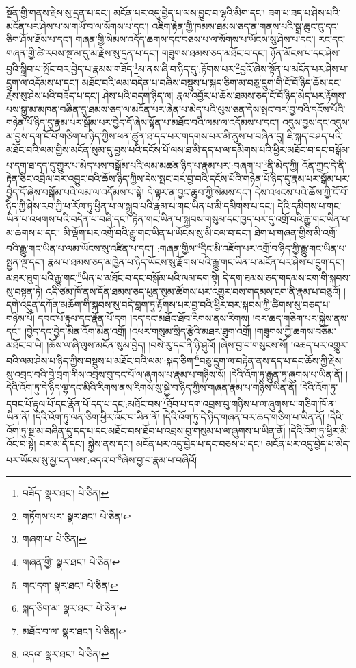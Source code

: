 སྔོན་གྱི་གནས་རྗེས་སུ་དྲན་པ་དང་། མངོན་པར་འདུ་བྱེད་པ་ལས་བྱུང་བ་ལྷའི་མིག་དང་། ཟག་པ་ཟད་པ་ཤེས་པའི་མངོན་པར་ཤེས་པ་ས་གཡོ་བ་ལ་སོགས་པ་དང་། འཇིག་རྟེན་གྱི་ཁམས་ཐམས་ཅད་ན་གནས་པའི་སྒྲ་ཆུང་ངུ་དང་ཅིག་ཤོས་ཐོས་པ་དང་། གཞན་གྱི་སེམས་འདོད་ཆགས་དང་བཅས་པ་ལ་སོགས་པ་ཡོངས་སུ་ཤེས་པ་དང་། རང་དང་གཞན་གྱི་ཚེ་རབས་སྔ་མ་དུ་མ་རྗེས་སུ་དྲན་པ་དང་། གཟུགས་ཐམས་ཅད་མཐོང་བ་དང་། ཉོན་མོངས་པ་དང་ཤེས་བྱའི་སྒྲིབ་པ་སྤོང་བར་བྱེད་པ་རྣམས་གཟོད་\footnote{བཟོད་  སྣར་ཐང་།  པེ་ཅིན། }མ་ནས་ཞི་བ་ཉིད་དུ་:རྟོགས་པར་\footnote{གཏོགས་པར་  སྣར་ཐང་།  པེ་ཅིན། }བྱའོ་ཞེས་སྟོན་པ་མངོན་པར་ཤེས་པ་དྲུག་ལ་འདོམས་པ་དང་། མཐོང་བའི་ལམ་བདེན་པ་བཞིས་བསྡུས་པ་སྐད་ཅིག་མ་བཅུ་དྲུག་གི་ངོ་བོ་ཉིད་ཆོས་དང་རྗེས་སུ་ཤེས་པའི་བཟོད་པ་དང་། ཤེས་པའི་བདག་ཉིད་ལ། རྣལ་འབྱོར་པ་ཆོས་ཐམས་ཅད་ངོ་བོ་ཉིད་མེད་པར་རྟོགས་པས་སྒྱུ་མ་མཁན་བཞིན་དུ་ཐམས་ཅད་ལ་མངོན་པར་ཞེན་པ་མེད་པའི་ལུས་ཅན་དེས་སྤང་བར་བྱ་བའི་དངོས་པོའི་གཉེན་པོ་ཉིད་དུ་རྣམ་པར་སྒོམ་པར་བྱེད་དོ་ཞེས་སྟོན་པ་མཐོང་བའི་ལམ་ལ་འདོམས་པ་དང་། འདུས་བྱས་དང་འདུས་མ་བྱས་དག་ངོ་བོ་གཅིག་པ་ཉིད་ཀྱིས་ཕན་ཚུན་ཐ་དད་པར་གདགས་པར་མི་ནུས་པ་བཞིན་དུ། ཇི་སྐད་བཤད་པའི་མཐོང་བའི་ལམ་གྱིས་མངོན་སུམ་དུ་བྱས་པའི་དངོས་པོ་ལས་ཐ་མི་དད་པ་ལ་དམིགས་པའི་ཕྱིར་མཐོང་བ་དང་བསྒོམ་པ་དག་ཐ་དད་དུ་གྱུར་པ་མེད་པས་བསྒོམ་པའི་ལམ་མཚན་ཉིད་པ་རྣམ་པར་:བཞག་པ་\footnote{གཞག་པ་  པེ་ཅིན། }ནི་མེད་ཀྱི། འོན་ཀྱང་དེ་ནི་རྟེན་ཅིང་འབྲེལ་བར་འབྱུང་བའི་ཆོས་ཉིད་ཀྱིས་དེས་སྤང་བར་བྱ་བའི་དངོས་པོའི་གཉེན་པོ་ཉིད་དུ་རྣམ་པར་སྒོམ་པར་བྱེད་དོ་ཞེས་བསྒོམ་པའི་ལམ་ལ་འདོམས་པ་སྟེ། དེ་ལྟར་ན་བྱང་ཆུབ་ཀྱི་སེམས་དང་། དེས་འཕངས་པའི་ཆོས་ཀྱི་ངོ་བོ་ཉིད་ཀྱི་ཤེས་རབ་ཀྱི་ཕ་རོལ་ཏུ་ཕྱིན་པ་ལ་སྒྲུབ་པའི་རྣམ་པ་གང་ཡིན་པ་མི་དམིགས་པ་དང་། དེའི་དམིགས་པ་གང་ཡིན་པ་འཕགས་པའི་བདེན་པ་བཞི་དང་། རྟེན་གང་ཡིན་པ་སྐྱབས་གསུམ་དང་ཁྱད་པར་དུ་འགྲོ་བའི་རྒྱུ་གང་ཡིན་པ་མ་ཆགས་པ་དང་། མི་ལྡོག་པར་འགྲོ་བའི་རྒྱུ་གང་ཡིན་པ་ཡོངས་སུ་མི་ངལ་བ་དང་། ཐེག་པ་གཞན་གྱིས་མི་འགྲོ་བའི་རྒྱུ་གང་ཡིན་པ་ལམ་ཡོངས་སུ་འཛིན་པ་དང་། :གཞན་གྱིས་\footnote{གཞན་གྱི་  སྣར་ཐང་།  པེ་ཅིན། }དྲིང་མི་འཇོག་པར་འགྲོ་བ་ཉིད་ཀྱི་རྒྱུ་གང་ཡིན་པ་སྤྱན་ལྔ་དང་། རྣམ་པ་ཐམས་ཅད་མཁྱེན་པ་ཉིད་ཡོངས་སུ་རྫོགས་པའི་རྒྱུ་གང་ཡིན་པ་མངོན་པར་ཤེས་པ་དྲུག་དང་། མཐར་ཐུག་པའི་རྒྱུ་གང་\footnote{གང་དག་  སྣར་ཐང་།  པེ་ཅིན། }ཡིན་པ་མཐོང་བ་དང་བསྒོམ་པའི་ལམ་དག་སྟེ། དེ་དག་ཐམས་ཅད་གདམས་ངག་གི་སྐབས་སུ་བསྟན་ཏེ། འདི་ཙམ་ཁོ་ནས་དོན་ཐམས་ཅད་ཕུན་སུམ་ཚོགས་པར་འགྱུར་བས་གདམས་ངག་ནི་རྣམ་པ་བཅུའོ། །དགེ་འདུན་དཀོན་མཆོག་གི་སྐབས་སུ་བདེ་བླག་ཏུ་རྟོགས་པར་བྱ་བའི་ཕྱིར་བར་སྐབས་ཀྱི་ཚིགས་སུ་བཅད་པ་གཉིས་པོ། དབང་པོ་རྟུལ་དང་རྣོན་པོ་དག །དད་དང་མཐོང་ཐོབ་རིགས་ནས་རིགས། །བར་ཆད་གཅིག་པར་སྐྱེས་ནས་དང་། །བྱེད་དང་བྱེད་མིན་འོག་མིན་འགྲོ། །འཕར་གསུམ་སྲིད་རྩེའི་མཐར་ཐུག་འགྲོ། །གཟུགས་ཀྱི་ཆགས་བཅོམ་མཐོང་བ་ཡི། །ཆོས་ལ་ཞི་ལུས་མངོན་སུམ་བྱེད། །བསེ་རུ་དང་ནི་ཉི་ཤུའོ། །ཞེས་བྱ་བ་གསུངས་སོ། །འཆད་པར་འགྱུར་བའི་ལམ་ཤེས་པ་ཉིད་ཀྱིས་བསྡུས་པ་མཐོང་བའི་ལམ་:སྐད་ཅིག་\footnote{སྐད་ཅིག་མ་  སྣར་ཐང་།  པེ་ཅིན། }བཅུ་དྲུག་ལ་བརྟེན་ནས་དད་པ་དང་ཆོས་ཀྱི་རྗེས་སུ་འབྲང་བའི་བྱེ་བྲག་གིས་འབྲས་བུ་དང་པོ་ལ་ཞུགས་པ་རྣམ་པ་གཉིས་སོ། །དེའི་འོག་ཏུ་རྒྱུན་ཏུ་ཞུགས་པ་ཡིན་ནོ། །དེའི་འོག་ཏུ་དེ་ཉིད་ལྷ་དང་མིའི་རིགས་ནས་རིགས་སུ་སྐྱེ་བ་ཉིད་ཀྱིས་གཞན་རྣམ་པ་གཉིས་ཡིན་ནོ། །དེའི་འོག་ཏུ་དབང་པོ་རྟུལ་པོ་དང་རྣོན་པོ་དད་པ་དང་:མཐོང་བས་\footnote{མཐོང་བ་ལ་  སྣར་ཐང་།  པེ་ཅིན། }ཐོབ་པ་དག་འབྲས་བུ་གཉིས་པ་ལ་ཞུགས་པ་གཅིག་ཁོ་ན་ཡིན་ནོ། །དེའི་འོག་ཏུ་ལན་ཅིག་ཕྱིར་འོང་བ་ཡིན་ནོ། །དེའི་འོག་ཏུ་དེ་ཉིད་གཞན་བར་ཆད་གཅིག་པ་ཡིན་ནོ། །དེའི་འོག་ཏུ་སྔ་མ་བཞིན་དུ་དད་པ་དང་མཐོང་བས་ཐོབ་པ་འབྲས་བུ་གསུམ་པ་ལ་ཞུགས་པ་ཡིན་ནོ། །དེའི་འོག་ཏུ་ཕྱིར་མི་འོང་བ་སྟེ། བར་མ་དོ་དང་། སྐྱེས་ནས་དང་། མངོན་པར་འདུ་བྱེད་པ་དང་བཅས་པ་དང་། མངོན་པར་འདུ་བྱེད་པ་མེད་པར་ཡོངས་སུ་མྱ་ངན་ལས་:འདའ་བ་\footnote{འདའ་  སྣར་ཐང་།  པེ་ཅིན། }ཞེས་བྱ་བ་རྣམ་པ་བཞིའོ། 
